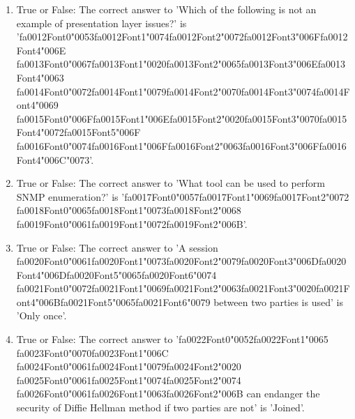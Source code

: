 \documentclass[12pt]{article}
\begin{document}
\begin{enumerate}[label=\arabic*.]
\item True or False: The correct answer to 'Which of the following is not an example of presentation layer issues?' is '{\csname fa0012Font0\endcsname\char"0053}{\csname fa0012Font1\endcsname\char"0074}{\csname fa0012Font2\endcsname\char"0072}{\csname fa0012Font3\endcsname\char"006F}{\csname fa0012Font4\endcsname\char"006E} {\csname fa0013Font0\endcsname\char"0067}{\csname fa0013Font1\endcsname\char"0020}{\csname fa0013Font2\endcsname\char"0065}{\csname fa0013Font3\endcsname\char"006E}{\csname fa0013Font4\endcsname\char"0063} {\csname fa0014Font0\endcsname\char"0072}{\csname fa0014Font1\endcsname\char"0079}{\csname fa0014Font2\endcsname\char"0070}{\csname fa0014Font3\endcsname\char"0074}{\csname fa0014Font4\endcsname\char"0069} {\csname fa0015Font0\endcsname\char"006F}{\csname fa0015Font1\endcsname\char"006E}{\csname fa0015Font2\endcsname\char"0020}{\csname fa0015Font3\endcsname\char"0070}{\csname fa0015Font4\endcsname\char"0072}{\csname fa0015Font5\endcsname\char"006F} {\csname fa0016Font0\endcsname\char"0074}{\csname fa0016Font1\endcsname\char"006F}{\csname fa0016Font2\endcsname\char"0063}{\csname fa0016Font3\endcsname\char"006F}{\csname fa0016Font4\endcsname\char"006C}{\char"0073}'.
\item True or False: The correct answer to 'What tool can be used to perform SNMP enumeration?' is '{\csname fa0017Font0\endcsname\char"0057}{\csname fa0017Font1\endcsname\char"0069}{\csname fa0017Font2\endcsname\char"0072} {\csname fa0018Font0\endcsname\char"0065}{\csname fa0018Font1\endcsname\char"0073}{\csname fa0018Font2\endcsname\char"0068} {\csname fa0019Font0\endcsname\char"0061}{\csname fa0019Font1\endcsname\char"0072}{\csname fa0019Font2\endcsname\char"006B}'.
\item True or False: The correct answer to 'A session {\csname fa0020Font0\endcsname\char"0061}{\csname fa0020Font1\endcsname\char"0073}{\csname fa0020Font2\endcsname\char"0079}{\csname fa0020Font3\endcsname\char"006D}{\csname fa0020Font4\endcsname\char"006D}{\csname fa0020Font5\endcsname\char"0065}{\csname fa0020Font6\endcsname\char"0074} {\csname fa0021Font0\endcsname\char"0072}{\csname fa0021Font1\endcsname\char"0069}{\csname fa0021Font2\endcsname\char"0063}{\csname fa0021Font3\endcsname\char"0020}{\csname fa0021Font4\endcsname\char"006B}{\csname fa0021Font5\endcsname\char"0065}{\csname fa0021Font6\endcsname\char"0079} between two parties is used' is 'Only once'.
\item True or False: The correct answer to '{\csname fa0022Font0\endcsname\char"0052}{\csname fa0022Font1\endcsname\char"0065} {\csname fa0023Font0\endcsname\char"0070}{\csname fa0023Font1\endcsname\char"006C} {\csname fa0024Font0\endcsname\char"0061}{\csname fa0024Font1\endcsname\char"0079}{\csname fa0024Font2\endcsname\char"0020} {\csname fa0025Font0\endcsname\char"0061}{\csname fa0025Font1\endcsname\char"0074}{\csname fa0025Font2\endcsname\char"0074} {\csname fa0026Font0\endcsname\char"0061}{\csname fa0026Font1\endcsname\char"0063}{\csname fa0026Font2\endcsname\char"006B} can endanger the security of Diffie Hellman method if two parties are not' is 'Joined'.

\end{enumerate}
\end{document}
